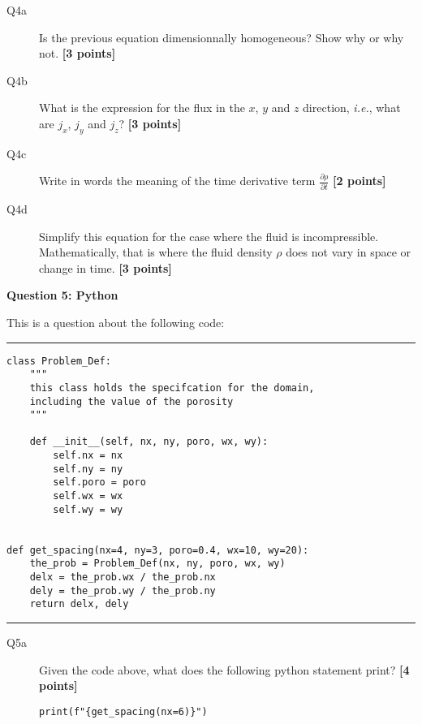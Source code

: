 \documentclass{article}
\begin{document}
\begin{description}
\item [Q4a] Is the previous equation dimensionnally homogeneous? Show why or why not. \textbf{[3 points]}
\vspace{2cm}
\item [Q4b] What is the expression for the flux in the $x$, $y$ and $z$ direction, \textit{i.e.}, what are $j_x$, $j_y$ and $j_z$? \textbf{[3 points]}
\vspace{2cm}
\item [Q4c] Write in words the meaning of the time derivative term $\frac{\partial \rho}{\partial t}$ \textbf{[2 points]}
\vspace{2cm}
\item [Q4d] Simplify this equation for the case where the fluid is incompressible. Mathematically, that is where the fluid density $\rho$ does not vary in space or change in time. \textbf{[3 points]}
\vspace{2cm}
\end{description}




\newpage
\textbf{Question 5: Python}


This is a question about the following code:

\rule{15cm}{0.75pt}


\begin{verbatim}
class Problem_Def:
    """
    this class holds the specifcation for the domain,
    including the value of the porosity
    """

    def __init__(self, nx, ny, poro, wx, wy):
        self.nx = nx
        self.ny = ny
        self.poro = poro
        self.wx = wx
        self.wy = wy


def get_spacing(nx=4, ny=3, poro=0.4, wx=10, wy=20):
    the_prob = Problem_Def(nx, ny, poro, wx, wy)
    delx = the_prob.wx / the_prob.nx
    dely = the_prob.wy / the_prob.ny
    return delx, dely
\end{verbatim}

\rule{15cm}{0.75pt}

\begin{description}

\item[Q5a] Given the code above, what does the following python statement print?
  \textbf{[4 points]}
  
\verb+print(f"{get_spacing(nx=6)}")+

\vspace{1.5cm}
  
\end{description}
\end{document}

